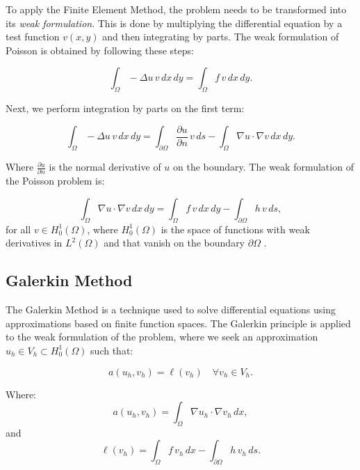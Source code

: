 To apply the Finite Element Method, the problem needs to be transformed into its \textit{weak formulation}. This is done by multiplying the differential equation by a test function \(v(x,y)\) and then integrating by parts. The weak formulation of Poisson is obtained by following these steps:

\begin{equation}
    \int_\Omega -\Delta u \, v \, dx \, dy = \int_\Omega f \, v \, dx \, dy.
\end{equation}

Next, we perform integration by parts on the first term:

\begin{equation}
    \int_\Omega -\Delta u \, v \, dx \, dy = \int_{\partial \Omega} \frac{\partial u}{\partial n} \, v \, ds - \int_\Omega \nabla u \cdot \nabla v \, dx \, dy.
\end{equation}

Where \(\frac{\partial u}{\partial n}\) is the normal derivative of \(u\) on the boundary. The weak formulation of the Poisson problem is:

\begin{equation}
    \int_\Omega \nabla u \cdot \nabla v \, dx \, dy = \int_\Omega f \, v \, dx \, dy - \int_{\partial \Omega} h \, v \, ds,
\end{equation}
for all \(v \in H_0^1(\Omega)\), where \(H_0^1(\Omega)\) is the space of functions with weak derivatives in \(L^2(\Omega)\) and that vanish on the boundary \(\partial \Omega\) \cite{weak_formulation}.

\subsection{Galerkin Method}

The Galerkin Method is a technique used to solve differential equations using approximations based on finite function spaces. The Galerkin principle is applied to the weak formulation of the problem, where we seek an approximation \(u_h \in V_h \subset H_0^1(\Omega)\) such that:

\begin{equation}
    a(u_h, v_h) = \ell(v_h) \quad \forall v_h \in V_h.
\end{equation}

Where:
\begin{equation}
    a(u_h, v_h) = \int_\Omega \nabla u_h \cdot \nabla v_h \, dx,
\end{equation}
and
\begin{equation}
    \ell(v_h) = \int_\Omega f \, v_h \, dx - \int_{\partial \Omega} h \, v_h \, ds.
\end{equation}

